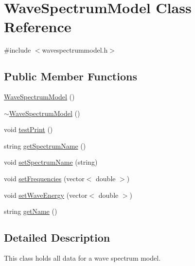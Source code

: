 \hypertarget{class_wave_spectrum_model}{\section{Wave\-Spectrum\-Model Class Reference}
\label{class_wave_spectrum_model}
}


{\ttfamily \#include $<$wavespectrummodel.\-h$>$}

\subsection*{Public Member Functions}
\begin{DoxyCompactItemize}
\item 
\hyperlink{class_wave_spectrum_model_a27fb5c7bab09749bc00d6e667d1620b5}{Wave\-Spectrum\-Model} ()
\item 
\hyperlink{class_wave_spectrum_model_a685de8c7862651192ed0dcca488fae69}{$\sim$\-Wave\-Spectrum\-Model} ()
\item 
void \hyperlink{class_wave_spectrum_model_a861bb326842594becd0aa667bc225c5b}{test\-Print} ()
\item 
string \hyperlink{class_wave_spectrum_model_af42c92f7755b74b546ced8ee07991318}{get\-Spectrum\-Name} ()
\item 
void \hyperlink{class_wave_spectrum_model_abfc6fb0e2db440f9e5ff8394aa335542}{set\-Spectrum\-Name} (string)
\item 
void \hyperlink{class_wave_spectrum_model_af04eea9c01cbe16411f2073e55214b2a}{set\-Frequencies} (vector$<$ double $>$)
\item 
void \hyperlink{class_wave_spectrum_model_a366aa079730302d63109b128b750fca0}{set\-Wave\-Energy} (vector$<$ double $>$)
\item 
string \hyperlink{class_wave_spectrum_model_a28a41df01982f6c248d18ac11240aa0f}{get\-Name} ()
\end{DoxyCompactItemize}


\subsection{Detailed Description}
This class holds all data for a wave spectrum model. 

